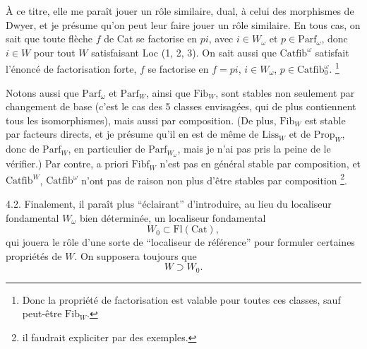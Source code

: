 \documentclass[11pt]{article}
\newcommand{\printedpage}[1]{\marginpar{\footnotesize p.~#1}}
\newcommand{\msp}[1]{\marginpar{\footnotesize [#1]}}
\newcommand{\Fib}{\mathrm{Fib}}
\newcommand{\Fibf}{\mathrm{Fibf}}
\newcommand{\Parf}{\mathrm{Parf}}
\newcommand{\Catfib}{\mathrm{Catfib}}
\newcommand{\Cat}{\mathrm{Cat}}
\begin{document}
À ce titre, elle me paraît jouer un rôle similaire, dual, à celui des morphismes de Dwyer, et je présume qu'on peut leur faire jouer un rôle similaire. En tous \msp{page 29} cas, on sait que toute flèche $f$ de Cat se factorise en $pi$, avec $i \in W_\omega$ et $p \in \Parf_\omega$, donc $i \in W$ pour tout $W$ satisfaisant Loc (1, 2, 3). On sait aussi que $\Catfib^\omega$ satisfait l'énoncé de factorisation forte, $f$ se factorise en $f = pi$, $i \in W_\omega$, $p \in \Catfib_0^\omega$. \footnote[21]{Donc la propriété de factorisation est valable pour toutes ces classes, sauf peut-être $\Fib_W$.}

Notons aussi que $\Parf_\omega$ et $\Parf_W$, ainsi que $\Fib_W$, sont stables non seulement par changement de base (c'est le cas des 5 classes envisagées, qui de plus contiennent tous les isomorphismes), mais aussi par composition. (De plus, $\Fib_W$ est stable par facteurs directs, et je présume qu'il en est de même de $\mathrm{Liss}_W$ et de $\mathrm{Prop}_W$, donc de $\Parf_W$, en particulier de $\Parf_{W_\omega}$, mais je n'ai pas pris la peine de le vérifier.) Par contre, a priori $\Fibf_W$ n'est pas en général stable par composition, et $\Catfib^W$, $\Catfib^\omega$ n'ont pas de raison
\printedpage{20}
non plus d'être stables par composition \footnote[22]{il faudrait expliciter par des exemples.}.

4.2. Finalement, il paraît plus “éclairant” d'introduire, au lieu du localiseur fondamental $W_\omega$ bien déterminée, un localiseur fondamental %
\[
W_0 \subset \mathrm{Fl}(\Cat),
\]
qui jouera le rôle d'une sorte de “localiseur de référence” pour formuler certaines propriétés de $W$. On supposera toujours que
\[
W \supset W_0.
\]

\msp{page 30}
\end{document}
